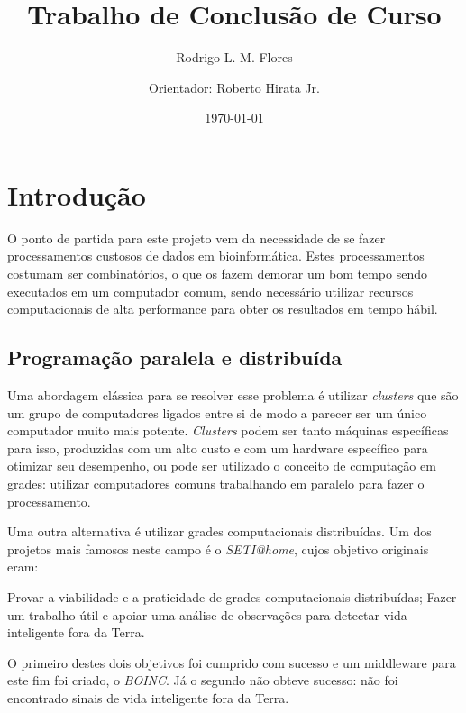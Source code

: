\documentclass[a4paper,12pt,titlepage]{article}
\title{Trabalho de Conclusão de Curso \\ }
\author{Rodrigo L. M. Flores \and
        Orientador: Roberto Hirata Jr. }
\date{\today}
\begin{document}
\maketitle

\section{Introdução}

O ponto de partida para este projeto vem da necessidade de se fazer processamentos custosos de 
dados em bioinformática. Estes processamentos costumam ser combinatórios, o que os fazem
demorar um bom tempo sendo executados em um computador comum, sendo necessário utilizar recursos
computacionais de alta performance para obter os resultados em tempo hábil.

\subsection{Programação paralela e distribuída}

Uma abordagem clássica para se resolver esse problema é utilizar \textit{clusters} que são um grupo de computadores
ligados entre si de modo a parecer ser um único computador muito mais potente. \textit{Clusters} podem ser tanto máquinas
específicas para isso, produzidas com um alto custo e com um hardware específico para otimizar seu desempenho, ou 
pode ser utilizado o conceito de computação em grades: utilizar computadores comuns trabalhando em paralelo 
para fazer o processamento. 

Uma outra alternativa é utilizar grades computacionais distribuídas. Um dos projetos mais famosos neste 
campo é o \textit{SETI@home}, cujos objetivo originais eram:

\begin{itemize}
  \itemize Provar a viabilidade e a praticidade de grades computacionais distribuídas;
  \itemize Fazer um trabalho útil e apoiar uma análise de observações para detectar vida inteligente fora da Terra.
\end{itemize}

O primeiro destes dois objetivos foi cumprido com sucesso e um middleware para este fim foi criado, o \textit{BOINC}. Já
o segundo não obteve sucesso: não foi encontrado sinais de vida inteligente fora da Terra. 
\end{document}
